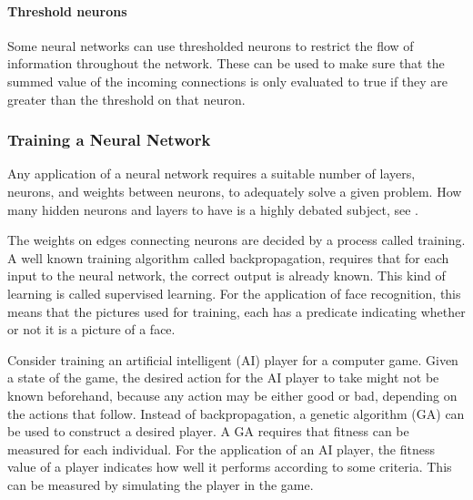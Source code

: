 \paragraph{Threshold neurons} Some neural networks can use thresholded neurons to restrict the flow of information throughout the network. These can be used to make sure that the summed value of the incoming connections is only evaluated to true if they are greater than the threshold on that neuron. 


\subsubsection{Training a Neural Network}
Any applica\-tion of a neural network requires a suitable number of layers, neurons, and weights between neurons, to adequately solve a given problem. How many hidden neurons and layers to have is a highly debated subject, see \cite{sarle1997}.

The weights on edges connecting neurons are decided by a process called training.  A well known training algorithm called backpropagation, requires that for each input to the neural network, the correct output is already known\cite{backpropagation}. This kind of learning is called supervised learning. For the application of face recognition, this means that the pictures used for training, each has a predicate indicating whether or not it is a picture of a face.

Consider training an artificial intelligent (AI) player for a computer game. Given a state of the game, the desired action for the AI player to take might not be known beforehand, because any action may be either good or bad, depending on the actions that follow.  Instead of backpropagation, a genetic algorithm (GA) can be used to construct a desired player. A GA requires that fitness can be measured for each individual. For the application of an AI player, the fitness value of a player indicates how well it performs according to some criteria. This can be measured by simulating the player in the game.
